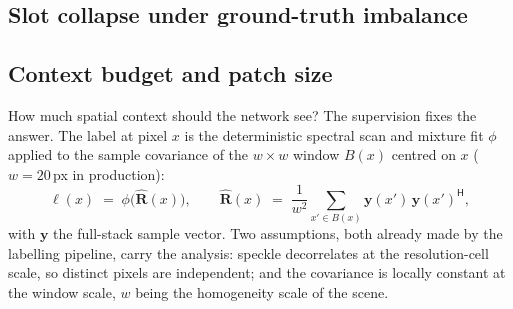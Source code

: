 \subsection{Slot collapse under ground-truth imbalance}
\label{sec:method_collapse}


\subsection{Context budget and patch size}
\label{sec:method_patch}

How much spatial context should the network see? The supervision fixes the answer. The label at pixel $x$ is the deterministic spectral scan and mixture fit $\phi$ applied to the sample covariance of the $w \times w$ window $B(x)$ centred on $x$ ($w = 20$\,px in production):
\begin{equation}
  \ell(x) \;=\; \phi\bigl(\hat{\mathbf{R}}(x)\bigr),
  \qquad
  \hat{\mathbf{R}}(x) \;=\; \frac{1}{w^2} \sum_{x' \in B(x)} \mathbf{y}(x')\,\mathbf{y}(x')^{\mathsf{H}},
  \label{eq:label_cov}
\end{equation}
with $\mathbf{y}$ the full-stack sample vector. Two assumptions, both already made by the labelling pipeline, carry the analysis: speckle decorrelates at the resolution-cell scale, so distinct pixels are independent; and the covariance is locally constant at the window scale, $w$ being the homogeneity scale of the scene.

